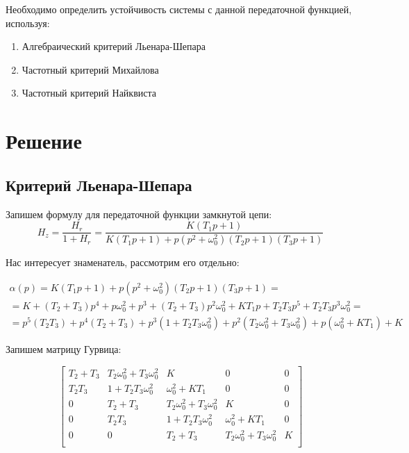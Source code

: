 \documentclass[12pt]{article}
\begin{document}
Необходимо определить устойчивость системы с данной передаточной функцией, используя:
\begin{enumerate}
 \item Алгебраический критерий Льенара-Шепара
 \item Частотный критерий Михайлова
 \item Частотный критерий Найквиста
\end{enumerate}

\section{Решение}
\subsection{Критерий Льенара-Шепара}

Запишем формулу для передаточной функции замкнутой цепи:
\begin{equation}
 H_{z} = \dfrac{H_{r}}{1 + H_{r}} = \dfrac{K(T_1p + 1)}{K(T_1p + 1) + p(p^2+\omega_0^2)(T_2p + 1)(T_3p + 1)}
\end{equation}

Нас интересует знаменатель, рассмотрим его отдельно:

\begin{eqnarray}
 \alpha(p) = K(T_1p + 1) + p(p^2+\omega_0^2)(T_2p + 1)(T_3p + 1) = \nonumber \\ 
 = K + (T_2 + T_3)p^4 + p\omega_0^2 + p^3 + (T_2 + T_3)p^2\omega_0^2 + KT_1p + T_2T_3p^5 + T_2T_3p^3\omega_0^2 = \nonumber \\
 = p^5(T_2T_3) + p^4(T_2 + T_3) + p^3(1 + T_2T_3\omega_0^2) + p^2(T_2\omega_0^2 + T_3\omega_0^2) + p(\omega_0^2 + KT_1) + K
\end{eqnarray}

Запишем матрицу Гурвица:

$$
\begin{bmatrix}
 T_2 + T_3 & T_2\omega_0^2 + T_3\omega_0^2 & K & 0 & 0 \\
 T_2T_3 & 1 + T_2T_3\omega_0^2 & \omega_0^2 + KT_1 & 0 & 0\\
 0 & T_2 + T_3 & T_2\omega_0^2 + T_3\omega_0^2 & K & 0  \\
 0 & T_2T_3 & 1 + T_2T_3\omega_0^2 & \omega_0^2 + KT_1 & 0 \\
 0 & 0 & T_2 + T_3 & T_2\omega_0^2 + T_3\omega_0^2 & K \\
\end{bmatrix}
$$
\end{document}
